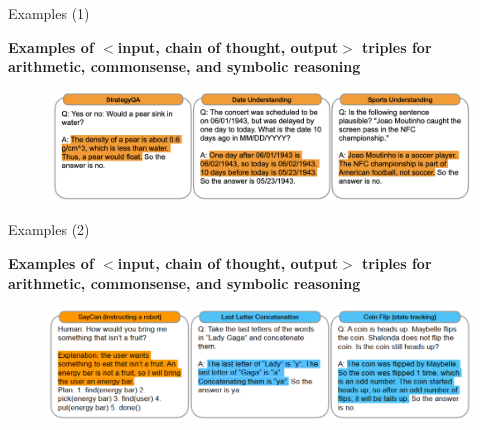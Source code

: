 
\begin{vbframe}{Examples (1)}

\vfill

\textbf{Examples of $<$input, chain of thought, output$>$ triples for arithmetic, commonsense, and symbolic reasoning}

\begin{figure}
    \centering
    \includegraphics{figure/cot_examples_1.png}\\
\end{figure}

\vfill

\end{vbframe}


\begin{vbframe}{Examples (2)}

\vfill

\textbf{Examples of $<$input, chain of thought, output$>$ triples for arithmetic, commonsense, and symbolic reasoning}

\begin{figure}
    \centering
    \includegraphics{figure/cot_examples_2.png}\\
\end{figure}

\vfill

\end{vbframe}

